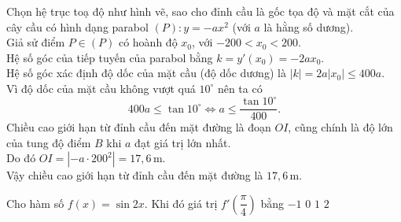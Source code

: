 \begin{ex}
{\begin{center}
		\end{center}
		Chọn hệ trục toạ độ  như hình vẽ, sao cho đỉnh cầu là gốc tọa độ và mặt cắt của cây cầu có hình dạng parabol $(P)\colon y=-ax^2$ (với $a$ là hằng số dương).\\
		Giả sử điểm $P\in (P)$ có hoành độ  $x_0$, với $-200<x_0<200$.\\
		Hệ số góc của tiếp tuyến  của parabol bằng $k=y' \left(x_0 \right)=-2ax_0$.\\
		Hệ số góc xác định độ dốc của mặt cầu (độ dốc dương) là  $\left|k\right|=2a\left|x_0\right|\le 400a$.\\
		Vì độ dốc của  mặt cầu không vượt quá $10^\circ$ nên ta có
		\[400a\le \tan 10^\circ\Leftrightarrow a\le  \dfrac{\tan 10^\circ}{400}.
		 \]
		Chiều cao giới hạn từ đỉnh cầu  đến mặt đường là đoạn $OI$, cũng chính là độ lớn của tung độ điểm $B$ khi $a$ đạt giá trị lớn nhất.\\
		Do đó $OI=\left|-a\cdot 200^2\right|=17{,}6$\,m.\\ 
		Vậy chiều cao giới hạn  từ đỉnh cầu đến mặt đường là $17{,}6$\,m.
	 }
\end{ex}

\begin{ex}%
	Cho hàm  số $f(x)=\sin2x$. Khi đó giá trị $f'\left(\dfrac{\pi}{4}\right)$ bằng
	\choice 
		{$-1$} 
		{\True  $0$}
		{$1$} 
		 {$2$}
\end{ex}

